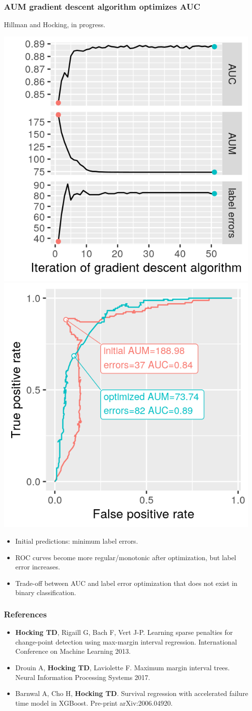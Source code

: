 \documentclass{beamer}
\begin{document}
\begin{frame}
  \frametitle{AUM gradient descent algorithm optimizes AUC}
  
  Hillman and Hocking, in progress.

  \includegraphics[width=0.49\linewidth]{figure-aum-optimized-iterations-emph}
  \includegraphics[width=0.49\linewidth]{figure-aum-train-pred-only} 

  \begin{itemize}
  \item Initial predictions: minimum label errors.
  \item ROC curves become more regular/monotonic after optimization,
    but label error increases.
  \item Trade-off between AUC and label error optimization that does
    not exist in binary classification.
  \end{itemize}
\end{frame}

\begin{frame}
  \frametitle{References}
  \scriptsize
  \begin{itemize}
  \item \textbf{Hocking TD}, Rigaill G, Bach F, Vert J-P. Learning
    sparse penalties for change-point detection using max-margin
    interval regression. International Conference on Machine Learning
    2013.
  \item Drouin A, \textbf{Hocking TD}, Laviolette F. Maximum margin interval
    trees. Neural Information Processing Systems 2017.
  \item Barnwal A, Cho H, \textbf{Hocking TD}. Survival regression with
    accelerated failure time model in XGBoost. Pre-print arXiv:2006.04920.
  \end{itemize}
\end{frame}
\end{document}

